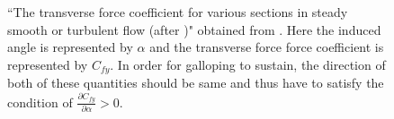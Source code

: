 \begin{figure}
	
  \setlength{\unitlength}{\textwidth}

  \caption{ ``The transverse force coefficient for various sections in steady smooth or turbulent flow (after \citet{Blevins1990})" obtained from \citet{Paidoussis2010}. Here the induced angle is represented by $\alpha$ and the transverse force force coefficient is represented by $C_{fy}$. In order for galloping to sustain, the direction of both of these quantities should be same and thus have to satisfy the condition of $\frac{\partial C_{fy}}{\partial \alpha } >0$.}
    \label{fig:par_diff_cross_sec}
\end{figure}

